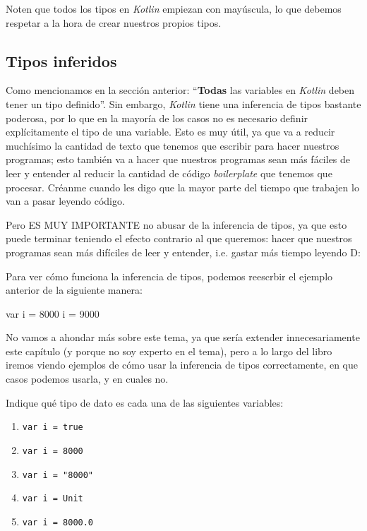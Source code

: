     \begin{important}
      Noten que todos los tipos en \textit{Kotlin} empiezan con mayúscula, lo que debemos respetar a 
      la hora de crear nuestros propios tipos.
    \end{important}

  \subsection{Tipos inferidos}
    Como mencionamos en la sección anterior: \enquote{\textbf{Todas} las variables en 
    \textit{Kotlin} deben tener un tipo definido}.
    Sin embargo, \textit{Kotlin} tiene una inferencia de tipos bastante poderosa, por lo que en la 
    mayoría de los casos no es necesario definir explícitamente el tipo de una variable.
    Esto es muy útil, ya que va a reducir muchísimo la cantidad de texto que tenemos que escribir
    para hacer nuestros programas; esto también va a hacer que nuestros programas sean más fáciles
    de leer y entender al reducir la cantidad de código \textit{boilerplate} que tenemos que 
    procesar.
    Créanme cuando les digo que la mayor parte del tiempo que trabajen lo van a pasar leyendo 
    código.

    Pero ES MUY IMPORTANTE no abusar de la inferencia de tipos, ya que esto puede terminar teniendo
    el efecto contrario al que queremos: hacer que nuestros programas sean más difíciles de leer y
    entender, i.e. gastar más tiempo leyendo D:

    Para ver cómo funciona la inferencia de tipos, podemos reescrbir el ejemplo anterior de la
    siguiente manera:

    \begin{kotlin}
      var i = 8000
      i = 9000
    \end{kotlin}
    
    No vamos a ahondar más sobre este tema, ya que sería extender innecesariamente este capítulo (y
    porque no soy experto en el tema), pero a lo largo del libro iremos viendo ejemplos de cómo
    usar la inferencia de tipos correctamente, en que casos podemos usarla, y en cuales no.

    \begin{exercise}
      Indique qué tipo de dato es cada una de las siguientes variables:

      \begin{enumerate}
        \item \texttt{var i = true}
        \item \texttt{var i = 8000}
        \item \texttt{var i = "8000"}
        \item \texttt{var i = Unit}
        \item \texttt{var i = 8000.0}
      \end{enumerate}

    \end{exercise}

